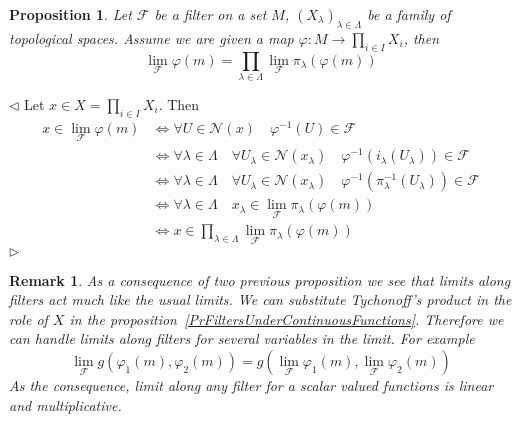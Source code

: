 \documentclass[12pt]{article}
\newtheorem{proposition}[theorem]{Proposition}
\newtheorem{remark}[theorem]{Remark}
\newenvironment{proof}{\par $\triangleleft$}{$\triangleright$}
\begin{document}
\begin{proposition}\label{PrTopProdAndFilters} Let $\mathcal{F}$ be a filter on
    a set $M$, ${(X_\lambda)}_{\lambda\in \Lambda}$ be a family of topological
    spaces. Assume we are given a map $\varphi:M\to \prod_{i\in I}X_i$, then
    $$
        \lim_{\mathcal{F}}\varphi(m)=
        \prod_{\lambda\in\Lambda}\lim_{\mathcal{F}}\pi_\lambda(\varphi(m))
    $$
\end{proposition}
\begin{proof} Let $x\in X=\prod_{i\in I}X_i$. Then
    $$
        \begin{aligned}
            x\in \lim_{\mathcal{F}}\varphi(m)
             & \Longleftrightarrow
            \forall U\in\mathcal{N}(x)\quad\varphi^{-1}(U)\in\mathcal{F} \\
             & \Longleftrightarrow
            \forall \lambda\in\Lambda\quad\forall
            U_\lambda\in\mathcal{N}(x_\lambda)
            \quad\varphi^{-1}(i_\lambda(U_\lambda))\in\mathcal{F}        \\
             & \Longleftrightarrow
            \forall \lambda\in\Lambda\quad\forall
            U_\lambda\in\mathcal{N}(x_\lambda)
            \quad\varphi^{-1}(\pi^{-1}_\lambda(U_\lambda))\in\mathcal{F} \\
             & \Longleftrightarrow
            \forall \lambda\in\Lambda
            \quad x_\lambda\in\lim_{\mathcal{F}}\pi_\lambda(\varphi(m))  \\
             & \Longleftrightarrow
            x\in\prod_{\lambda\in\Lambda}
            \lim_{\mathcal{F}}\pi_\lambda(\varphi(m))
        \end{aligned}
    $$
\end{proof}

\begin{remark}\label{RemBasicPropertiesOfLimitsAlngFilters} As a consequence of
    two previous proposition we see that limits along filters act much like the
    usual limits. We can substitute Tychonoff's product in the role of $X$ in
    the proposition~\ref{PrFiltersUnderContinuousFunctions}. Therefore we can
    handle limits along filters for several variables in the limit. For example
    $$
        \lim_{\mathcal{F}}g(\varphi_1(m), \varphi_2(m))
        =g(\lim_{\mathcal{F}}\varphi_1(m), \lim_{\mathcal{F}}\varphi_2(m))
    $$
    As the consequence, limit along any filter for a scalar valued functions is
    linear and multiplicative.
\end{remark}
\end{document}
